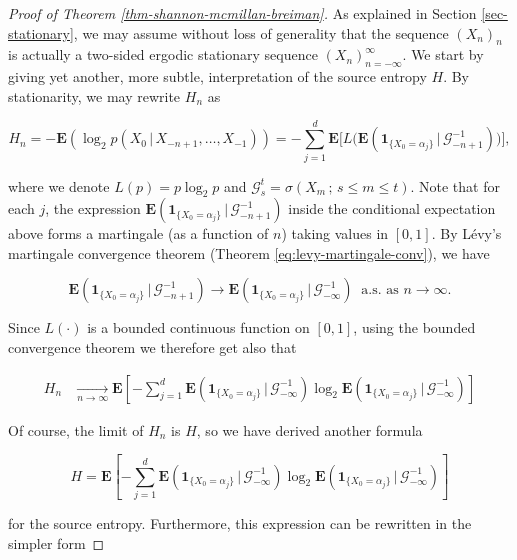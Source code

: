 \begin{proof}[Proof of Theorem \ref{thm-shannon-mcmillan-breiman}]
As explained in Section \ref{sec-stationary}, we may
assume without loss of generality that the sequence
$(X_n)_n$ is actually a two-sided ergodic stationary
sequence $(X_n)_{n=-\infty}^\infty$. We start by
giving yet another, more subtle, interpretation of the
source entropy $H$. By stationarity, we may rewrite
$H_n$ as

\[
H_n = -\mathbf{E}(\log_2 p(X_0\,|\,X_{-n+1},\ldots,X_{-1})) = -\sum_{j=1}^d \mathbf{E}\Big[ L\big(
\mathbf{E}\left(\mathbf{1}_{\{X_0=\alpha_j\}}\,|\,\mathcal{G}_{-n+1}^{-1}\right) \big)\Big],
\]

\noindent where we denote $L(p) = p\log_2 p$ and
$\mathcal{G}_s^t = \sigma(X_m\,;\, s\le m\le t)$.
Note that for each $j$, the expression
$\mathbf{E}\left(\mathbf{1}_{\{X_0=\alpha_j\}}\,|\,\mathcal{G}_{-n+1}^{-1}\right)$
inside the conditional expectation above forms a
martingale (as a function of $n$) taking values in
$[0,1]$. By L\'evy's martingale convergence theorem
(Theorem \ref{eq:levy-martingale-conv}), we have

\[
\mathbf{E}\left(\mathbf{1}_{\{X_0=\alpha_j\}}\,|\,\mathcal{G}_{-n+1}^{-1}\right) \to \mathbf{E}\left(\mathbf{1}_{\{X_0=\alpha_j\}}\,|\,\mathcal{G}_{-\infty}^{-1}\right) \ \textrm{ a.s. as }n\to\infty.
\]

\noindent Since $L(\cdot)$ is a bounded continuous function on
$[0,1]$, using the bounded convergence theorem we
therefore get also that

\begin{align*}
H_n
&\xrightarrow[n\to\infty]{} \mathbf{E}\left[ -\sum_{j=1}^d \mathbf{E}\left(\mathbf{1}_{\{X_0=\alpha_j\}}\,|\,\mathcal{G}_{-\infty}^{-1}\right)
\log_2 \mathbf{E}\left(\mathbf{1}_{\{X_0=\alpha_j\}}\,|\,\mathcal{G}_{-\infty}^{-1}\right)
\right]
\end{align*}

\noindent Of course, the limit of $H_n$ is $H$, so we have
derived another formula

\begin{equation*} \tag{35}\label{eq:entropy-newformula}
H = \mathbf{E}\left[ -\sum_{j=1}^d \mathbf{E}\left(\mathbf{1}_{\{X_0=\alpha_j\}}\,|\,\mathcal{G}_{-\infty}^{-1}\right)
\log_2 \mathbf{E}\left(\mathbf{1}_{\{X_0=\alpha_j\}}\,|\,\mathcal{G}_{-\infty}^{-1}\right)
\right]
\end{equation*}

\noindent for the source entropy. Furthermore, this expression
can be rewritten in the simpler form


\end{proof}

